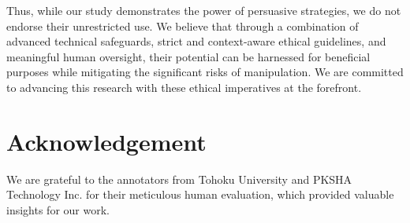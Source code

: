 \documentclass[11pt]{article}
\begin{document}
Thus, while our study demonstrates the power of persuasive strategies, we do not endorse their unrestricted use. We believe that through a combination of advanced technical safeguards, strict and context-aware ethical guidelines, and meaningful human oversight, their potential can be harnessed for beneficial purposes while mitigating the significant risks of manipulation. We are committed to advancing this research with these ethical imperatives at the forefront.




\section{Acknowledgement}
We are grateful to the annotators from Tohoku University and PKSHA Technology Inc. for their meticulous human evaluation, which provided valuable insights for our work.



\clearpage
\appendix

\end{document}
